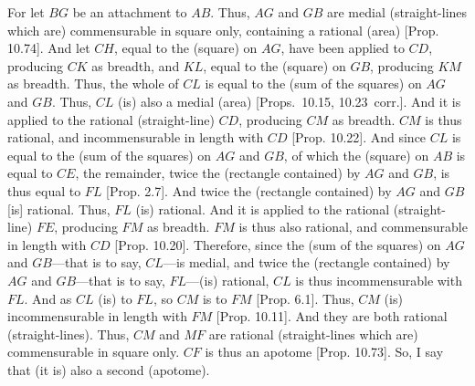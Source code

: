 \begin{Parallel}{}{}
{For let $BG$ be an attachment to $AB$. Thus,
$AG$ and $GB$ are medial (straight-lines which are)
commensurable in square only, containing a rational (area)
[Prop. 10.74]. And let $CH$, equal to
the (square) on $AG$, have been applied to $CD$, producing $CK$
as breadth, and $KL$, equal to the (square) on $GB$, producing $KM$ as
breadth. Thus, the whole of $CL$ is equal to the (sum of the squares)
on $AG$ and $GB$. Thus, $CL$ (is) also a medial (area) [Props.~10.15, 10.23~corr.]. And it is
applied to the rational (straight-line) $CD$, producing $CM$ as breadth.
$CM$ is thus rational, and incommensurable in length with
$CD$ [Prop. 10.22]. And since $CL$ is equal to the
(sum of the squares) on $AG$ and $GB$, of which the (square)
on $AB$ is equal to $CE$, 
the remainder, twice  the (rectangle contained) by $AG$ and $GB$, is thus equal to $FL$ [Prop. 2.7]. And twice the (rectangle contained)
by $AG$ and $GB$ [is] rational. Thus, $FL$ (is) rational. And it
is applied to the rational (straight-line) $FE$, producing $FM$ as breadth.
$FM$ is thus also rational, and commensurable in length with $CD$
[Prop. 10.20]. Therefore, since the (sum of the squares) on $AG$ and $GB$---that is to say, $CL$---is medial, 
and twice the (rectangle contained) by $AG$ and $GB$---that is to say,
$FL$---(is) rational, $CL$ is thus incommensurable with $FL$. 
And as $CL$ (is) to $FL$, so $CM$ is to $FM$ [Prop. 6.1]. Thus, $CM$ (is) incommensurable
in length with $FM$ [Prop. 10.11]. And they are both rational (straight-lines). Thus, $CM$ and $MF$ are rational (straight-lines which are) commensurable in square only. $CF$ is thus an
apotome [Prop. 10.73]. So, I say that (it is)
also a second (apotome).

\epsfysize=1.6in
\centerline{}

}
\end{Parallel}
